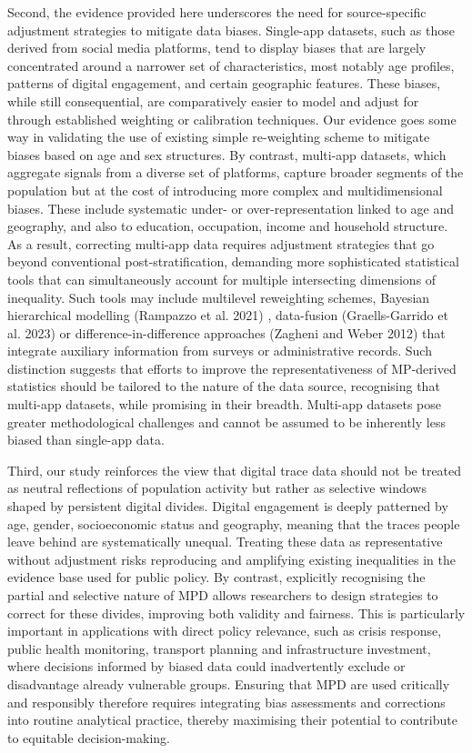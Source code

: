 \documentclass{article}
\begin{document}
Second, the evidence provided here underscores the need for
source-specific adjustment strategies to mitigate data biases.
Single-app datasets, such as those derived from social media platforms,
tend to display biases that are largely concentrated around a narrower
set of characteristics, most notably age profiles, patterns of digital
engagement, and certain geographic features. These biases, while still
consequential, are comparatively easier to model and adjust for through
established weighting or calibration techniques. Our evidence goes some
way in validating the use of existing simple re-weighting scheme to
mitigate biases based on age and sex structures. By contrast, multi-app
datasets, which aggregate signals from a diverse set of platforms,
capture broader segments of the population but at the cost of
introducing more complex and multidimensional biases. These include
systematic under- or over-representation linked to age and geography,
and also to education, occupation, income and household structure. As a
result, correcting multi-app data requires adjustment strategies that go
beyond conventional post-stratification, demanding more sophisticated
statistical tools that can simultaneously account for multiple
intersecting dimensions of inequality. Such tools may include multilevel
reweighting schemes, Bayesian hierarchical modelling (Rampazzo et al. 2021) ,
data-fusion (Graells-Garrido et al. 2023) or difference-in-difference
approaches (Zagheni and Weber 2012) that integrate auxiliary information from
surveys or administrative records. Such distinction suggests that
efforts to improve the representativeness of MP-derived statistics
should be tailored to the nature of the data source, recognising that
multi-app datasets, while promising in their breadth. Multi-app datasets
pose greater methodological challenges and cannot be assumed to be
inherently less biased than single-app data.

Third, our study reinforces the view that digital trace data should not
be treated as neutral reflections of population activity but rather as
selective windows shaped by persistent digital divides. Digital
engagement is deeply patterned by age, gender, socioeconomic status and
geography, meaning that the traces people leave behind are
systematically unequal. Treating these data as representative without
adjustment risks reproducing and amplifying existing inequalities in the
evidence base used for public policy. By contrast, explicitly
recognising the partial and selective nature of MPD allows researchers
to design strategies to correct for these divides, improving both
validity and fairness. This is particularly important in applications
with direct policy relevance, such as crisis response, public health
monitoring, transport planning and infrastructure investment, where
decisions informed by biased data could inadvertently exclude or
disadvantage already vulnerable groups. Ensuring that MPD are used
critically and responsibly therefore requires integrating bias
assessments and corrections into routine analytical practice, thereby
maximising their potential to contribute to equitable decision-making.
\end{document}
